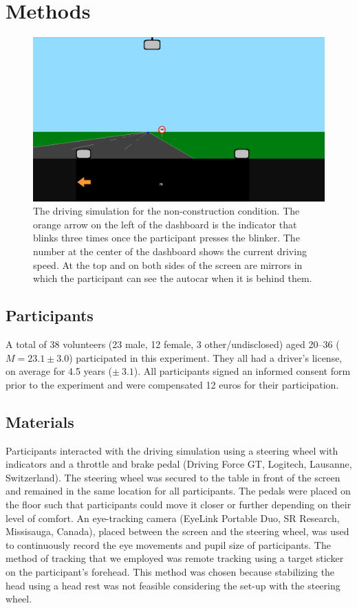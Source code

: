 
\section{Methods}\label{sec:methods}
\begin{figure}[tp]
  \centering
  \includegraphics[width=\textwidth]{images/screenshot_noncon_blinker.pdf}
  \caption{The driving simulation for the non-construction condition.
  The orange arrow on the left of the dashboard is the indicator that blinks three times once the participant presses the blinker.
  The number at the center of the dashboard shows the current driving speed. 
  At the top and on both sides of the screen are mirrors in which the participant can see the autocar when it is behind them.}
  \label{fig:screenshot_noncon}
\end{figure}

\subsection{Participants}
A total of 38 volunteers (23 male, 12 female, 3 other/undisclosed) aged 20--36 (\(M = 23.1 \pm 3.0\)) participated in this experiment. 
They all had a driver's license, on average for 4.5 years (\(\pm\ 3.1\)).
All participants signed an informed consent form prior to the experiment and were compensated 12 euros for their participation.

\subsection{Materials}
Participants interacted with the driving simulation using a steering wheel with indicators and a throttle and brake pedal (Driving Force GT, Logitech, Lausanne, Switzerland). 
The steering wheel was secured to the table in front of the screen and remained in the same location for all participants. 
The pedals were placed on the floor such that participants could move it closer or further depending on their level of comfort. 
An eye-tracking camera (EyeLink Portable Duo, SR Research, Missisauga, Canada), placed between the screen and the steering wheel, was used to continuously record the eye movements and pupil size of participants. 
The method of tracking that we employed was remote tracking using a target sticker on the participant's forehead.
This method was chosen because stabilizing the head using a head rest was not feasible considering the set-up with the steering wheel.

